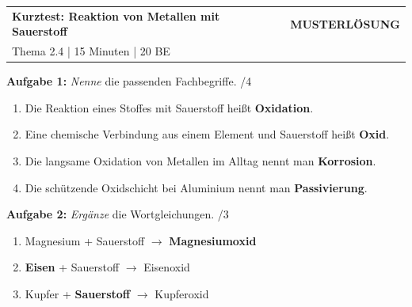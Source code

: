 \documentclass[11pt, a4paper]{article}
\newcommand{\punkte}[1]{\hfill\textcolor{mittelgrau}{/#1}}
\newcommand{\lsg}[1]{\textcolor{loesung}{\textbf{#1}}}
\begin{document}

\begin{tcolorbox}[colback=loesung!10, colframe=loesung, boxrule=1pt, arc=0pt, left=8pt, right=8pt, top=6pt, bottom=6pt]
\begin{tabular}{@{}p{8cm}p{6cm}@{}}
\textbf{\large Kurztest: Reaktion von Metallen mit Sauerstoff} & \textcolor{loesung}{\textbf{MUSTERLÖSUNG}} \\[0.3em]
Thema 2.4 | 15 Minuten | 20 BE &
\end{tabular}
\end{tcolorbox}

\vspace{0.8em}


\textbf{Aufgabe 1:} \textit{Nenne} die passenden Fachbegriffe. \punkte{4}

\begin{enumerate}[label=\alph*), leftmargin=2em, itemsep=0.5em]
    \item Die Reaktion eines Stoffes mit Sauerstoff heißt \lsg{Oxidation}.
    \item Eine chemische Verbindung aus einem Element und Sauerstoff heißt \lsg{Oxid}.
    \item Die langsame Oxidation von Metallen im Alltag nennt man \lsg{Korrosion}.
    \item Die schützende Oxidschicht bei Aluminium nennt man \lsg{Passivierung}.
\end{enumerate}

\vspace{0.5em}


\textbf{Aufgabe 2:} \textit{Ergänze} die Wortgleichungen. \punkte{3}

\begin{enumerate}[label=\alph*), leftmargin=2em, itemsep=0.8em]
    \item Magnesium + Sauerstoff $\longrightarrow$ \lsg{Magnesiumoxid}
    \item \lsg{Eisen} + Sauerstoff $\longrightarrow$ Eisenoxid
    \item Kupfer + \lsg{Sauerstoff} $\longrightarrow$ Kupferoxid
\end{enumerate}
\end{document}
